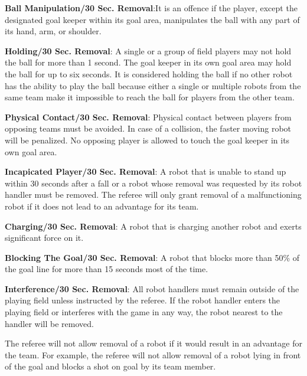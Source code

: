 \documentclass[12pt]{hurocup}
\begin{document}
\begin{lawlist}[US]

\item \textbf{Ball Manipulation/30 Sec. Removal}:It is an offence if the
  player, except the designated goal keeper within its goal area,
  manipulates the ball with any part of its hand, arm, or shoulder.

\item \textbf{Holding/30 Sec. Removal}: A single or a group of field
  players may not hold the ball for more than 1 second. The goal
  keeper in its own goal area may hold the ball for up to six
  seconds. It is considered holding the ball if no other robot has the
  ability to play the ball because either a single or multiple robots
  from the same team make it impossible to reach the ball for players
  from the other team.

\item \textbf{Physical Contact/30 Sec. Removal}: Physical contact
  between players from opposing teams must be avoided. In case of a
  collision, the faster moving robot will be penalized. No opposing
  player is allowed to touch the goal keeper in its own goal area.

\item \textbf{Incapicated Player/30 Sec. Removal}: A robot that is
  unable to stand up within 30 seconds after a fall or a robot whose
  removal was requested by its robot handler must be removed. The
  referee will only grant removal of a malfunctioning robot if it does
  not lead to an advantage for its team.

\item \textbf{Charging/30 Sec. Removal}: A robot that is charging
  another robot and exerts significant force on it.

\item \textbf{Blocking The Goal/30 Sec. Removal}: A robot that blocks
  more than 50\% of the goal line for more than 15 seconds most of the
  time.

\item \textbf{Interference/30 Sec. Removal}: All robot handlers must
  remain outside of the playing field unless instructed by the
  referee. If the robot handler enters the playing field or interferes
  with the game in any way, the robot nearest to the handler will be
  removed.

\end{lawlist}

\begin{decisions}
\item The referee will not allow removal of a robot if it would result
  in an advantage for the team. For example, the referee will not
  allow removal of a robot lying in front of the goal and blocks a
  shot on goal by its team member.
\end{decisions}
\end{document}
